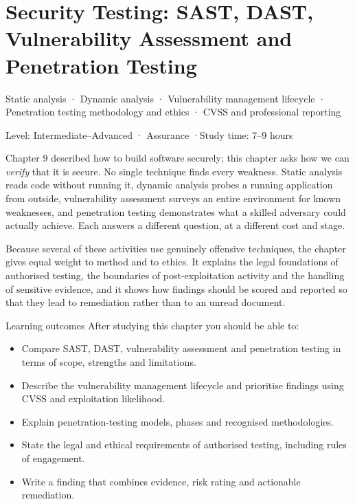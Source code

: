 \documentclass[11pt,openany]{book}
\newcommand{\chaptermeta}[3]{%
  {\sffamily\small\color{accent}#1\par}\vspace{0.3em}
  {\sffamily\footnotesize\color{gray}#2 \quad·\quad #3\par}\vspace{1.2em}}
\begin{document}
\chapter{Security Testing: SAST, DAST, Vulnerability Assessment and Penetration Testing}\label{ch:10}
\chaptermeta{Static analysis · Dynamic analysis · Vulnerability management lifecycle · Penetration testing methodology and ethics · CVSS and professional reporting}{Level: Intermediate–Advanced · Assurance}{Study time: 7–9 hours}

Chapter 9 described how to build software securely; this chapter asks how we can \emph{verify} that it is secure. No single technique finds every weakness. Static analysis reads code without running it, dynamic analysis probes a running application from outside, vulnerability assessment surveys an entire environment for known weaknesses, and penetration testing demonstrates what a skilled adversary could actually achieve. Each answers a different question, at a different cost and stage.

Because several of these activities use genuinely offensive techniques, the chapter gives equal weight to method and to ethics. It explains the legal foundations of authorised testing, the boundaries of post-exploitation activity and the handling of sensitive evidence, and it shows how findings should be scored and reported so that they lead to remediation rather than to an unread document.

\begin{outcomesbox}{Learning outcomes}
After studying this chapter you should be able to:
\begin{itemize}
  \item Compare SAST, DAST, vulnerability assessment and penetration testing in terms of scope, strengths and limitations.
  \item Describe the vulnerability management lifecycle and prioritise findings using CVSS and exploitation likelihood.
  \item Explain penetration-testing models, phases and recognised methodologies.
  \item State the legal and ethical requirements of authorised testing, including rules of engagement.
  \item Write a finding that combines evidence, risk rating and actionable remediation.
\end{itemize}
\end{outcomesbox}
\end{document}
